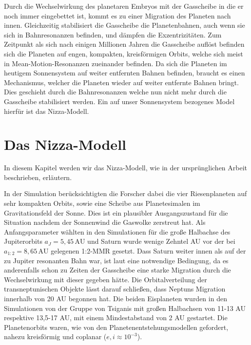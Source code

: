 \documentclass[12pt,a4paper,twoside]{article}
\newcommand{\AU}{\,\mathrm{AU}}
\begin{document}
Durch die Wechselwirkung des planetaren Embryos mit der Gasscheibe in die er noch immer eingebettet ist, kommt es zu einer Migration des Planeten nach innen. Gleichzeitig stabilisiert die Gasscheibe die Planetenbahnen, auch wenn sie sich in Bahnresonanzen befinden, und dämpfen die Exzentrizitäten. Zum Zeitpunkt als sich nach einigen Millionen Jahren die Gasscheibe auflöst befinden sich die Planeten auf engen, kompakten, kreisförmigen Orbits, welche sich meist in Mean-Motion-Resonanzen zueinander befinden\cite{Nesvorny2011}.
Da sich die Planeten im heutigem Sonnensystem auf weiter entfernten Bahnen befinden, braucht es einen Mechanismus, welcher die Planeten wieder auf weiter entfernte Bahnen bringt. Dies geschieht durch die Bahnresonanzen welche nun nicht mehr durch die Gasscheibe stabilisiert werden. Ein auf unser Sonnensystem bezogenes Model hierfür ist das Nizza-Modell.

\section{Das Nizza-Modell}\label{Orbits}
In diesem Kapitel werden wir das Nizza-Modell, wie in der ursprünglichen Arbeit\cite{Tsiganis2005} beschrieben, erläutern. %

In der Simulation berücksichtigten die Forscher dabei die vier Riesenplaneten auf sehr kompakten Orbits, sowie eine Scheibe aus Planetesimalen im Gravitationsfeld der Sonne. %
Dies ist ein plausibler Ausgangszustand für die Situation nachdem der Sonnenwind die Gaswolke %
zerstreut hat. %
Als Anfangsparameter wählten \cite{Tsiganis2005} in den Simulationen für die große Halbachse des Jupiterorbits $a_J = 5,45 \AU$ und Saturn wurde wenige Zehntel AU vor der bei $a_{1:2} = 8,65 \AU$ gelegenen 1:2-MMR gesetzt.
Dass Saturn weiter innen als auf der zu Jupiter resonanten Bahn war, ist laut \cite{Levison2008} eine notwendige Bedingung, da es anderenfalls schon zu Zeiten der Gasscheibe eine starke Migration durch die Wechselwirkung mit dieser gegeben hätte. %
Die Orbitalverteilung der transneptunischen Objekte lässt darauf schließen, dass Neptuns Migration innerhalb von 20 AU begonnen hat\cite{Tsiganis2005}.
Die beiden Eisplaneten wurden in den Simulationen von der Gruppe von Tsiganis mit großen Halbachsen von 11-13 AU respektive 13,5-17 AU, mit einem Mindestabstand von 2 AU gestartet.
Die Planetenorbits waren, wie von den Planetenentstehungsmodellen gefordert, %
nahezu kreisförmig und coplanar ($e, i \approx 10^{-3}$).
\end{document}
